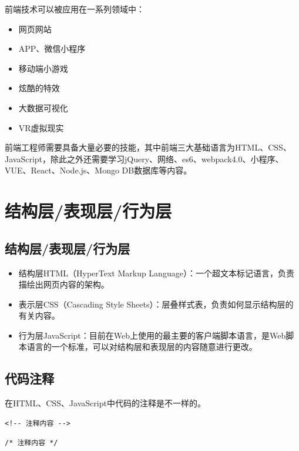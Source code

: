 前端技术可以被应用在一系列领域中：

\begin{itemize}
	\item 网页网站
	\item APP、微信小程序
	\item 移动端小游戏
	\item 炫酷的特效
	\item 大数据可视化
	\item VR虚拟现实
\end{itemize}

前端工程师需要具备大量必要的技能，其中前端三大基础语言为HTML、CSS、JavaScript，除此之外还需要学习jQuery、网络、es6、webpack4.0、小程序、VUE、React、Node.js、Mongo DB数据库等内容。 \\

\newpage

\section{结构层/表现层/行为层}

\subsection{结构层/表现层/行为层}

\begin{itemize}
	\item 结构层HTML（HyperText Markup Language）：一个超文本标记语言，负责描绘出网页内容的架构。

	\item 表示层CSS（Cascading Style Sheets）：层叠样式表，负责如何显示结构层的有关内容。

	\item 行为层JavaScript：目前在Web上使用的最主要的客户端脚本语言，是Web脚本语言的一个标准，可以对结构层和表现层的内容随意进行更改。
\end{itemize}

\subsection{代码注释}

在HTML、CSS、JavaScript中代码的注释是不一样的。

\begin{lstlisting}[style=htmlcssjs, title=HTML注释]
<!-- 注释内容 -->
\end{lstlisting}

\begin{lstlisting}[style=htmlcssjs, title=CSS注释]
/* 注释内容 */
\end{lstlisting}

